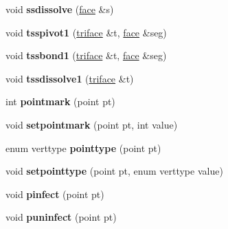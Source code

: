 \begin{DoxyCompactItemize}
\item 
\hypertarget{classtetgenmesh_a66ffac4c97815467190daa5d52fc69ef}{void {\bfseries ssdissolve} (\hyperlink{classtetgenmesh_1_1face}{face} \&s)}\label{classtetgenmesh_a66ffac4c97815467190daa5d52fc69ef}

\item 
\hypertarget{classtetgenmesh_aacae6665a54a9bf0a2fc57121ec06725}{void {\bfseries tsspivot1} (\hyperlink{classtetgenmesh_1_1triface}{triface} \&t, \hyperlink{classtetgenmesh_1_1face}{face} \&seg)}\label{classtetgenmesh_aacae6665a54a9bf0a2fc57121ec06725}

\item 
\hypertarget{classtetgenmesh_a6580d7cb0bf0caf9ebed36ff34c2d79a}{void {\bfseries tssbond1} (\hyperlink{classtetgenmesh_1_1triface}{triface} \&t, \hyperlink{classtetgenmesh_1_1face}{face} \&seg)}\label{classtetgenmesh_a6580d7cb0bf0caf9ebed36ff34c2d79a}

\item 
\hypertarget{classtetgenmesh_a788e44391533938a8f0d89ed0996e5d7}{void {\bfseries tssdissolve1} (\hyperlink{classtetgenmesh_1_1triface}{triface} \&t)}\label{classtetgenmesh_a788e44391533938a8f0d89ed0996e5d7}

\item 
\hypertarget{classtetgenmesh_a46fa5fabd0e8e806f7f8beb069732e21}{int {\bfseries pointmark} (point pt)}\label{classtetgenmesh_a46fa5fabd0e8e806f7f8beb069732e21}

\item 
\hypertarget{classtetgenmesh_ad2cce627693ef75e8fc956b0e0743800}{void {\bfseries setpointmark} (point pt, int value)}\label{classtetgenmesh_ad2cce627693ef75e8fc956b0e0743800}

\item 
\hypertarget{classtetgenmesh_a87204594ee11bb38e68e0381e6e04b6c}{enum verttype {\bfseries pointtype} (point pt)}\label{classtetgenmesh_a87204594ee11bb38e68e0381e6e04b6c}

\item 
\hypertarget{classtetgenmesh_a036752e66b8fcce81d7f983842fcf8d3}{void {\bfseries setpointtype} (point pt, enum verttype value)}\label{classtetgenmesh_a036752e66b8fcce81d7f983842fcf8d3}

\item 
\hypertarget{classtetgenmesh_a3da09b1723336c0d9e82677f8f30c965}{void {\bfseries pinfect} (point pt)}\label{classtetgenmesh_a3da09b1723336c0d9e82677f8f30c965}

\item 
\hypertarget{classtetgenmesh_a6220e341248cd83ab6ee1c0d71e4d160}{void {\bfseries puninfect} (point pt)}\label{classtetgenmesh_a6220e341248cd83ab6ee1c0d71e4d160}


\end{DoxyCompactItemize}

